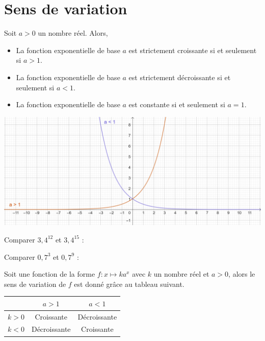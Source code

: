 \documentclass{article}
\begin{document}
\section{Sens de variation}
\begin{tcolorbox}
\begin{proposition}
Soit $a > 0$ un nombre réel. Alors,
\begin{itemize}
\item La fonction exponentielle de base $a$ est strictement croissante si et seulement si $a > 1$. 
\item La fonction exponentielle de base $a$ est strictement décroissante si et seulement si $a < 1$. 
\item La fonction exponentielle de base $a$ est constante si et seulement si $a = 1$. 
\end{itemize}
\end{proposition}
\end{tcolorbox}
\begin{center}
\includegraphics[width=\textwidth]{Variation_exponentielle.png}
\end{center}
\begin{example}
\hfill
\begin{enumquestions}
\item Comparer $3,4^{12}$ et $3,4^{15}$ : \answersline
\item Comparer $0,7^{3}$ et $0,7^{9}$ : \answersline
\end{enumquestions}
\end{example}
\begin{tcolorbox}
\begin{proposition}
Soit une fonction de la forme $f : x \mapsto k a^x$ avec $k$ un nombre réel et $a > 0$, alors le sens de variation de $f$ est donné grâce au tableau suivant.
\begin{center}
\begin{tabular}{|c|c|c|}
\hline
&$a > 1$&$a < 1$\\
\hline
$k > 0$& Croissante & Décroissante\\
\hline
$k < 0$& Décroissante & Croissante\\
\hline
\end{tabular}
\end{center}
\end{proposition}
\end{tcolorbox}
\newpage
\end{document}
